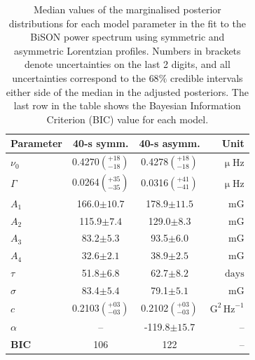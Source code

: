 \begin{table}[ht!]
	\begin{center}
		\caption{Median values of the marginalised posterior distributions for each model parameter in the fit to the BiSON power spectrum using symmetric and asymmetric Lorentzian profiles. Numbers in brackets denote uncertainties on the last 2 digits, and all uncertainties correspond to the $68 \%$ credible intervals either side of the median in the adjusted posteriors. The last row in the table shows the Bayesian Information Criterion (BIC) value for each model.}
		\label{tab:PSD_fit_params}
		\begin{tabular}{l c c r}
			\hline
			{\bf Parameter} & {\bf 40-s symm.} & {\bf 40-s asymm.} & {\bf Unit} \\
			\hline
			
			{$\nu_0$} & {0.4270$\left(_{-18}^{+18}\right)$} & {0.4278$\left(_{-18}^{+18}\right)$} & {$\upmu\mathrm{Hz} $}\\
			
			{$\Gamma$} & {0.0264$\left(_{-35}^{+35}\right)$} & {0.0316$\left(_{-41}^{+41}\right)$} & {$\upmu\mathrm{Hz} $} \\
			
			{$A_1$} & {166.0$\pm10.7 $} & {178.9$\pm 11.5$} & {$\mathrm{mG}$} \\
			
			{$A_2$} & {115.9$\pm7.4$} & {129.0$\pm 8.3$} & {$\mathrm{mG}$} \\
			
			{$A_3$} & {83.2$\pm5.3$} & {93.5$\pm 6.0$} & {$\mathrm{mG}$} \\
			
			{$A_4$} & {32.6$\pm2.1$} & {38.9$\pm 2.5$} &  {$\mathrm{mG}$} \\	
			
			{$\tau$} & {51.8$\pm6.8$} & {62.7$\pm8.2$} & {$\mathrm{days}$} \\	
			
			{$\sigma$} & {83.4$\pm5.4$} & {79.1$\pm5.1$} &  {$\mathrm{mG}$} \\	
			
			{$c$} & {0.2103$\left(_{-03}^{+03}\right)$} & {0.2102$\left(_{-03}^{+03}\right)$}  & {$\mathrm{G}^2 \, \mathrm{Hz}^{-1}$} \\	
			
			{$\alpha$} & {--} & {-119.8$\pm15.7$} & {--} \\	
			\hline
			{\bf BIC} & {106} & {122} & {--} \\
			\hline
		\end{tabular}
	\end{center}
\end{table}

